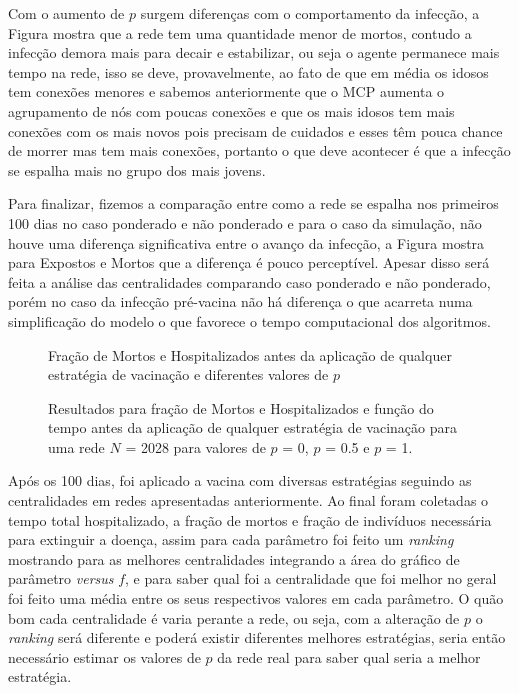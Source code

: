 Com o aumento de $p$ surgem diferenças com o comportamento da infecção, a Figura mostra que a rede tem uma quantidade menor de mortos, contudo a infecção demora mais para decair e estabilizar, ou seja o agente permanece mais tempo na rede, isso se deve, provavelmente, ao fato de que em média os idosos tem conexões menores e sabemos anteriormente que o MCP aumenta o agrupamento de nós com poucas conexões e que os mais idosos tem mais conexões com os mais novos pois precisam de cuidados e esses têm pouca chance de morrer mas tem mais conexões, portanto o que deve acontecer é que a infecção se espalha mais no grupo dos mais jovens.

Para finalizar, fizemos a comparação entre como a rede se espalha nos primeiros 100 dias no caso ponderado e não ponderado e para o caso da simulação, não houve uma diferença significativa entre o avanço da infecção, a Figura mostra para Expostos e Mortos que a diferença é pouco perceptível. Apesar disso será feita a análise das centralidades comparando caso ponderado e não ponderado, porém no caso da infecção pré-vacina não há diferença o que acarreta numa simplificação do modelo o que favorece o tempo computacional dos algoritmos.

\begin{figure}[H]
    \centering
    \captionsetup{font=normalsize,skip=0.8pt,singlelinecheck=on,labelsep=endash}
    \caption{Fração de Mortos e Hospitalizados antes da aplicação de qualquer estratégia de vacinação e diferentes valores de $p$}
    \vspace{5pt}
    \captionsetup{font=small,justification=justified}
    \caption*{Resultados para fração de Mortos e Hospitalizados e função do tempo antes da aplicação de qualquer estratégia de vacinação para uma rede $N$ = 2028 para valores de $p$ = 0, $p$ = 0.5 e $p$ = 1.}
    \label{fig:pre_vacina_mortos_p}
\end{figure}

Após os 100 dias, foi aplicado a vacina com diversas estratégias seguindo as centralidades em redes apresentadas anteriormente. Ao final foram coletadas o tempo total hospitalizado, a fração de mortos e fração de indivíduos necessária para extinguir a doença, assim para cada parâmetro foi feito um \textit{ranking} mostrando para as melhores centralidades integrando a área do gráfico de parâmetro \textit{versus} $f$, e para saber qual foi a centralidade que foi melhor no geral foi feito uma média entre os seus respectivos valores em cada parâmetro. O quão bom cada centralidade é varia perante a rede, ou seja, com a alteração de $p$ o \textit{ranking} será diferente e poderá existir diferentes melhores estratégias, seria então necessário estimar os valores de $p$ da rede real para saber qual seria a melhor estratégia. 

